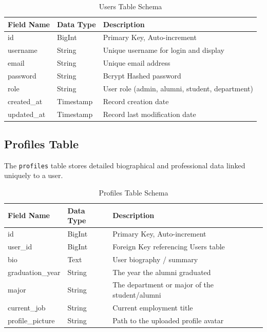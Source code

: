 \begin{table}[H]
    \centering
    \small
    \begin{tabular}{|l|l|p{8cm}|}
        \hline
        \textbf{Field Name} & \textbf{Data Type} & \textbf{Description} \\
        \hline
        id & BigInt & Primary Key, Auto-increment \\
        \hline
        username & String & Unique username for login and display \\
        \hline
        email & String & Unique email address \\
        \hline
        password & String & Bcrypt Hashed password \\
        \hline
        role & String & User role (admin, alumni, student, department) \\
        \hline
        created\_at & Timestamp & Record creation date \\
        \hline
        updated\_at & Timestamp & Record last modification date \\
        \hline
    \end{tabular}
    \vspace{0.2cm}
    \caption{Users Table Schema}
    \label{tab:users_schema}
\end{table}

\subsection{Profiles Table}
The \texttt{profiles} table stores detailed biographical and professional data linked uniquely to a user.

\begin{table}[H]
    \centering
    \small
    \begin{tabular}{|l|l|p{8cm}|}
        \hline
        \textbf{Field Name} & \textbf{Data Type} & \textbf{Description} \\
        \hline
        id & BigInt & Primary Key, Auto-increment \\
        \hline
        user\_id & BigInt & Foreign Key referencing Users table \\
        \hline
        bio & Text & User biography / summary \\
        \hline
        graduation\_year & String & The year the alumni graduated \\
        \hline
        major & String & The department or major of the student/alumni \\
        \hline
        current\_job & String & Current employment title \\
        \hline
        profile\_picture & String & Path to the uploaded profile avatar \\
        \hline
    \end{tabular}
    \vspace{0.2cm}
    \caption{Profiles Table Schema}
    \label{tab:profiles_schema}
\end{table}

